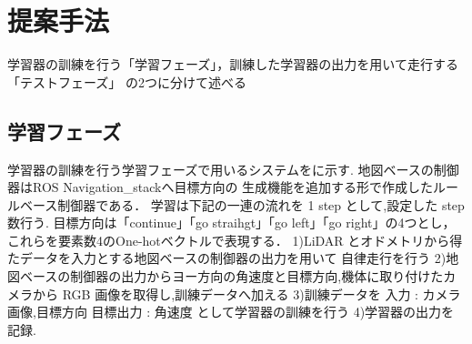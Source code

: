 \documentclass[10pt]{jarticle}
\begin{document}
    
    
    
    
    \section{提案手法}%
    学習器の訓練を行う「学習フェーズ」，訓練した学習器の出力を用いて走行する「テストフェーズ」
    の2つに分けて述べる
    \subsection{学習フェーズ}
    学習器の訓練を行う学習フェーズで用いるシステムをに示す.
    地図ベースの制御器はROS Navigation\_stackへ目標方向の
    生成機能を追加する形で作成したルールベース制御器である．
    学習は下記の一連の流れを 1 step として,設定した step 数行う.
    目標方向は「continue」「go straihgt」「go left」「go right」の4つとし，これらを要素数4のOne-hotベクトルで表現する．
    1)LiDAR とオドメトリから得たデータを入力とする地図ベースの制御器の出力を用いて
    自律走行を行う
    2)地図ベースの制御器の出力からヨー方向の角速度と目標方向,機体に取り付けたカメラから RGB 画像を取得し,訓練データへ加える
    3)訓練データを 入力 : カメラ画像,目標方向 目標出力 : 角速度 として学習器の訓練を行う
    4)学習器の出力を記録.
\end{document}
